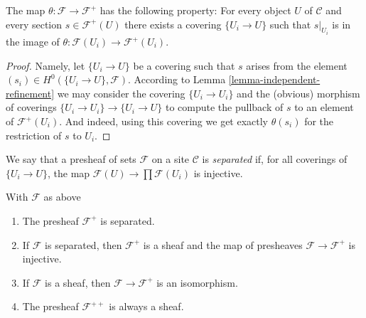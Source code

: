 \begin{lemma}
\label{lemma-plus-surjective}
The map $\theta : \mathcal{F} \to \mathcal{F}^+$ has the following
property: For every object $U$ of $\mathcal{C}$ and every section
$s \in \mathcal{F}^+(U)$ there exists a covering $\{U_i \to U\}$
such that $s|_{U_i}$ is in the image of $\theta: \mathcal{F}(U_i)
\to \mathcal{F}^{+}(U_i)$.
\end{lemma}

\begin{proof}
Namely, let $\{U_i \to U\}$ be a covering such that $s$ arises
from the element $(s_i) \in H^0(\{U_i \to U\}, \mathcal{F})$.
According to Lemma \ref{lemma-independent-refinement} we may
consider the covering $\{U_i \to U_i\}$ and the (obvious) morphism
of coverings $\{U_i \to U_i\} \to \{U_i \to U\}$ to compute the
pullback of $s$ to an element of $\mathcal{F}^+(U_i)$. And indeed,
using this covering we get exactly $\theta(s_i)$ for the restriction
of $s$ to $U_i$.
\end{proof}

\begin{definition}
\label{definition-separated}
We say that a presheaf of sets $\mathcal{F}$ on a site
$\mathcal{C}$ is {\it separated} if, for all coverings
of $\{U_i \rightarrow U\}$, the map
$\mathcal{F}(U) \to \prod \mathcal{F}(U_i)$ is injective.
\end{definition}

\begin{theorem}
\label{theorem-plus}
With $\mathcal{F}$ as above
\begin{enumerate}
\item
\label{item-sep}
The presheaf $\mathcal{F}^+$ is separated.
\item
\label{item-sheaf}
If $\mathcal{F}$ is separated, then $\mathcal{F}^+$ is a sheaf
and the map of presheaves $\mathcal{F} \to \mathcal{F}^+$ is injective.
\item
\label{item-plus-iso}
If $\mathcal{F}$ is a sheaf, then $\mathcal{F} \to \mathcal{F}^+$
is an isomorphism.
\item
\label{item-plusplus}
The presheaf $\mathcal{F}^{++}$ is always a sheaf.
\end{enumerate}
\end{theorem}

